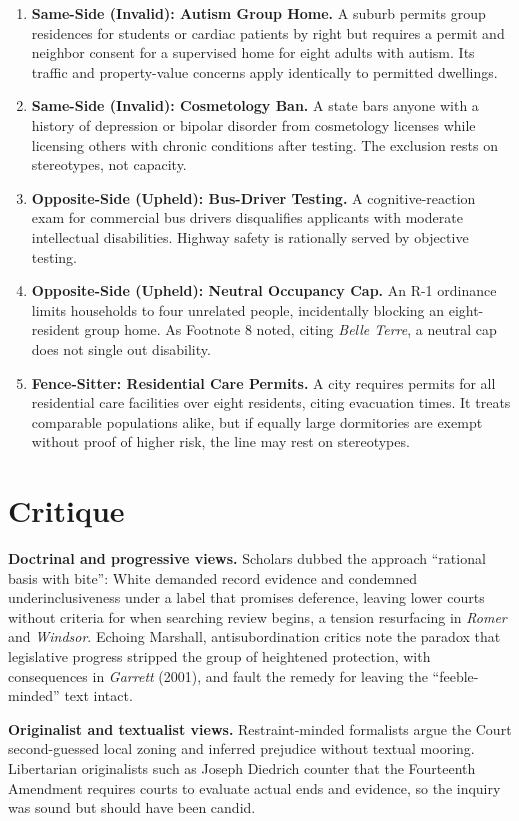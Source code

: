 \documentclass[12pt]{article}
\begin{document}
\begin{enumerate}
\item \textbf{Same-Side (Invalid): Autism Group Home.} A suburb permits group residences for students or cardiac patients by right but requires a permit and neighbor consent for a supervised home for eight adults with autism. Its traffic and property-value concerns apply identically to permitted dwellings.
\item \textbf{Same-Side (Invalid): Cosmetology Ban.} A state bars anyone with a history of depression or bipolar disorder from cosmetology licenses while licensing others with chronic conditions after testing. The exclusion rests on stereotypes, not capacity.
\item \textbf{Opposite-Side (Upheld): Bus-Driver Testing.} A cognitive-reaction exam for commercial bus drivers disqualifies applicants with moderate intellectual disabilities. Highway safety is rationally served by objective testing.
\item \textbf{Opposite-Side (Upheld): Neutral Occupancy Cap.} An R-1 ordinance limits households to four unrelated people, incidentally blocking an eight-resident group home. As Footnote 8 noted, citing \textit{Belle Terre}, a neutral cap does not single out disability.
\item \textbf{Fence-Sitter: Residential Care Permits.} A city requires permits for all residential care facilities over eight residents, citing evacuation times. It treats comparable populations alike, but if equally large dormitories are exempt without proof of higher risk, the line may rest on stereotypes.
\end{enumerate}

\section{Critique}

\textbf{Doctrinal and progressive views.} Scholars dubbed the approach ``rational basis with bite'': White demanded record evidence and condemned underinclusiveness under a label that promises deference, leaving lower courts without criteria for when searching review begins, a tension resurfacing in \textit{Romer} and \textit{Windsor}. Echoing Marshall, antisubordination critics note the paradox that legislative progress stripped the group of heightened protection, with consequences in \textit{Garrett} (2001), and fault the remedy for leaving the ``feeble-minded'' text intact.

\textbf{Originalist and textualist views.} Restraint-minded formalists argue the Court second-guessed local zoning and inferred prejudice without textual mooring. Libertarian originalists such as Joseph Diedrich counter that the Fourteenth Amendment requires courts to evaluate actual ends and evidence, so the inquiry was sound but should have been candid.
\end{document}
